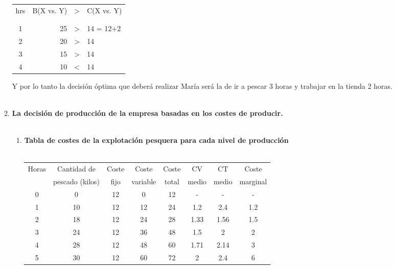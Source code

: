 \begin{enumerate}
\begin{enumerate}[\bfseries 2.1]
		\begin{tcolorbox}[colframe=white]
		    \begin{center}
			\begin{tabular}{c|rcl}
			    hrs&B(X vs. Y)&>&C(X vs. Y)\\\\
			    \hline\\
			       1&25&>&14 = 12+2\\
			       2&20&>&14\\
			       3&15&>&14\\
			       4&10&<&14\\
			\end{tabular}
		    \end{center}
		\end{tcolorbox}

		Y por lo tanto la decisión óptima que deberá realizar María será la de ir a pescar 3 horas y trabajar en la tienda 2 horas.\\\\

	    \item \textbf{La decisión de producción de la empresa basadas en los costes de producir.}\\\\

		\begin{enumerate}[\bfseries a)]

		    \item \textbf{Tabla de costes de la explotación pesquera para cada nivel de producción}\\\\
		    \begin{tcolorbox}[colframe=white]
			\begin{center}
			    \begin{tabular}{|c|c|c|c|c|c|c|c|}
				     \hline
				Horas&Cantidad de &Coste&Coste&Coste&CV&CT&Coste\\
				     &pescado (kilos)&fijo&variable&total&medio&medio&marginal\\
				     \hline
				     0&0&12&0&12&-&-&-\\
				     1&10&12&12&24&1.2 &2.4 &1.2\\
				     2&18&12&24&28&1.33&1.56&1.5\\
				     3&24&12&36&48&1.5 &2   &2\\
				     4&28&12&48&60&1.71&2.14&3\\
				     5&30&12&60&72&2   &2.4 &6\\
				     \hline
			    \end{tabular}
			\end{center}
		    \end{tcolorbox}
		    \vspace{1cm}


\end{enumerate}
\end{enumerate}
\end{enumerate}
